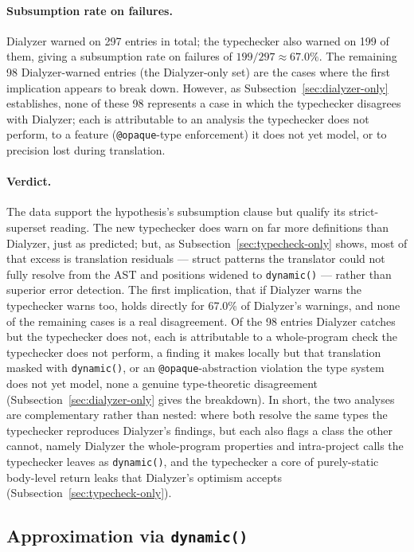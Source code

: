 \paragraph{Subsumption rate on failures.}
Dialyzer warned on 297 entries in total; the typechecker also warned on 199 of them, giving a subsumption rate on failures of $199/297 \approx 67.0\%$.
The remaining 98 Dialyzer-warned entries (the Dialyzer-only set) are the cases where the first implication appears to break down.
However, as Subsection~\ref{sec:dialyzer-only} establishes, none of these 98 represents a case in which the typechecker disagrees with Dialyzer; each is attributable to an analysis the typechecker does not perform, to a feature (\texttt{@opaque}-type enforcement) it does not yet model, or to precision lost during translation.

\paragraph{Verdict.}
The data support the hypothesis's subsumption clause but qualify its strict-superset reading.
The new typechecker does warn on far more definitions than Dialyzer, just as predicted; but, as Subsection~\ref{sec:typecheck-only} shows, most of that excess is translation residuals --- struct patterns the translator could not fully resolve from the AST and positions widened to \texttt{dynamic()} --- rather than superior error detection.
The first implication, that if Dialyzer warns the typechecker warns too, holds directly for 67.0\% of Dialyzer's warnings, and none of the remaining cases is a real disagreement.
Of the 98 entries Dialyzer catches but the typechecker does not, each is attributable to a whole-program check the typechecker does not perform, a finding it makes locally but that translation masked with \texttt{dynamic()}, or an \texttt{@opaque}-abstraction violation the type system does not yet model, none a genuine type-theoretic disagreement (Subsection~\ref{sec:dialyzer-only} gives the breakdown).
In short, the two analyses are complementary rather than nested: where both resolve the same types the typechecker reproduces Dialyzer's findings, but each also flags a class the other cannot, namely Dialyzer the whole-program properties and intra-project calls the typechecker leaves as \texttt{dynamic()}, and the typechecker a core of purely-static body-level return leaks that Dialyzer's optimism accepts (Subsection~\ref{sec:typecheck-only}).

\subsection{Approximation via \texttt{dynamic()}}
\label{sec:approximation-via-dynamic}

